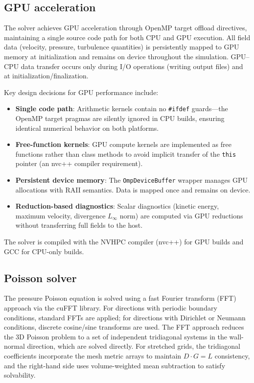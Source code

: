 \subsection{GPU acceleration}

The solver achieves GPU acceleration through OpenMP target offload directives, maintaining a single source code path for both CPU and GPU execution.
All field data (velocity, pressure, turbulence quantities) is persistently mapped to GPU memory at initialization and remains on device throughout the simulation.
GPU--CPU data transfer occurs only during I/O operations (writing output files) and at initialization/finalization.

Key design decisions for GPU performance include:
\begin{itemize}
    \item \textbf{Single code path}: Arithmetic kernels contain no \texttt{\#ifdef} guards---the OpenMP target pragmas are silently ignored in CPU builds, ensuring identical numerical behavior on both platforms.
    \item \textbf{Free-function kernels}: GPU compute kernels are implemented as free functions rather than class methods to avoid implicit transfer of the \texttt{this} pointer (an nvc++ compiler requirement).
    \item \textbf{Persistent device memory}: The \texttt{OmpDeviceBuffer} wrapper manages GPU allocations with RAII semantics. Data is mapped once and remains on device.
    \item \textbf{Reduction-based diagnostics}: Scalar diagnostics (kinetic energy, maximum velocity, divergence $L_\infty$ norm) are computed via GPU reductions without transferring full fields to the host.
\end{itemize}

The solver is compiled with the NVHPC compiler (nvc++) for GPU builds and GCC for CPU-only builds.

\subsection{Poisson solver}

The pressure Poisson equation is solved using a fast Fourier transform (FFT) approach via the cuFFT library.
For directions with periodic boundary conditions, standard FFTs are applied; for directions with Dirichlet or Neumann conditions, discrete cosine/sine transforms are used.
The FFT approach reduces the 3D Poisson problem to a set of independent tridiagonal systems in the wall-normal direction, which are solved directly.
For stretched grids, the tridiagonal coefficients incorporate the mesh metric arrays to maintain $D \cdot G = L$ consistency, and the right-hand side uses volume-weighted mean subtraction to satisfy solvability.

